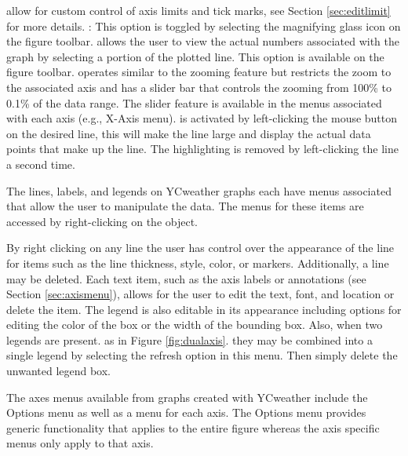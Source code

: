 \begin{enumerate}
		 allow for custom control of axis limits and tick marks, see Section \ref{sec:editlimit} for more details.
		: This option is toggled by selecting the magnifying glass icon on the figure toolbar. 
		 allows the user to view the actual numbers associated with the graph by selecting a portion of the plotted line.  This option is available on the figure toolbar.
		 operates similar to the zooming feature but restricts the zoom to the associated axis and has a slider bar that controls the zooming from 100\% to 0.1\% of the data range.  The slider feature is available in the menus associated with each axis (e.g., X-Axis menu).
		 is activated by left-clicking the mouse button on the desired line, this will make the line large and display the actual data points that make up the line.  The highlighting is removed by left-clicking the line a second time.
\end{enumerate}

The lines, labels, and legends on YCweather graphs each have menus associated that allow the user to manipulate the data.  The menus for these items are accessed by right-clicking on the object.

\begin{itemize}
	  By right clicking on any line the user has control over the appearance of the line for items such as the line thickness, style, color, or markers.  Additionally, a line may be deleted.
	  Each text item, such as the axis labels or annotations (see Section \ref{sec:axismenu}), allows for the user to edit the text, font, and location or delete the item. 
	  The legend is also editable in its appearance including options for editing the color of the box or the width of the bounding box.  Also, when two legends are present. as in Figure \ref{fig:dualaxis}. they may be combined into a single legend by selecting the refresh option in this menu.  Then simply delete the unwanted legend box.
\end{itemize}
	
\label{sec:axismenu}
The axes menus available from graphs created with YCweather include the Options menu as well as a menu for each axis.  The Options menu provides generic functionality that applies to the entire figure whereas the axis specific menus only apply to that axis.

